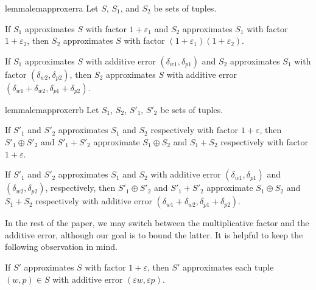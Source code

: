 \documentclass[a4paper,UKenglish,cleveref, autoref, thm-restate, pdfa]{lipics-v2021}
\newcommand{\eps}{\varepsilon}
\begin{document}
\begin{restatable}{lemma}{lemapproxerra}
    \label{lem:approx-err-1}
    Let $S$, $S_1$, and $S_2$ be sets of tuples. 
    \begin{romanenumerate}
        \item If $S_1$ approximates $S$ with factor $1 + \eps_1$ and $S_2$ approximates $S_1$ with factor $1 + \eps_2$, then $S_2$ approximates $S$ with factor $(1 + \eps_1)(1 + \eps_2)$.

        \item If $S_1$ approximates $S$ with additive error $(\delta_{w1}, \delta_{p1})$ and $S_2$ approximates $S_1$ with factor $(\delta_{w2}, \delta_{p2})$, then $S_2$ approximates $S$ with additive error $(\delta_{w1} + \delta_{w2}, \delta_{p1}+ \delta_{p2})$.
    \end{romanenumerate}
\end{restatable}


\begin{restatable}{lemma}{lemapproxerrb}\label{lem:approx-err-2}
    Let $S_1$, $S_2$, $S'_1$, $S'_2$ be sets of tuples.
    \begin{romanenumerate}
        \item If $S'_1$ and $S'_2$ approximates $S_1$ and $S_2$ respectively with factor $1 + \eps$, then 
        $S'_1 \oplus S'_2$ and $S'_1 + S'_2$ approximate $S_1 \oplus S_2$ and $S_1 + S_2$ respectively with factor $1 + \eps$.

        \item If $S'_1$ and $S'_2$ approximates $S_1$ and $S_2$ with additive error $(\delta_{w1}, \delta_{p1})$ and $(\delta_{w2}, \delta_{p2})$, respectively, then 
        $S'_1 \oplus S'_2$ and $S'_1 + S'_2$ approximate $S_1 \oplus S_2$ and $S_1 + S_2$ respectively with additive error $(\delta_{w1} + \delta_{w2}, \delta_{p1}+ \delta_{p2})$.
    \end{romanenumerate}
\end{restatable}


In the rest of the paper, we may switch between the multiplicative factor and the additive error, although our goal is to bound the latter. It is helpful to keep the following observation in mind.
\begin{observation}
    If $S'$ approximates $S$ with factor $1 + \eps$, then $S'$ approximates each tuple $(w, p) \in S$ with additive error $(\eps w, \eps p)$.
\end{observation}
\end{document}
